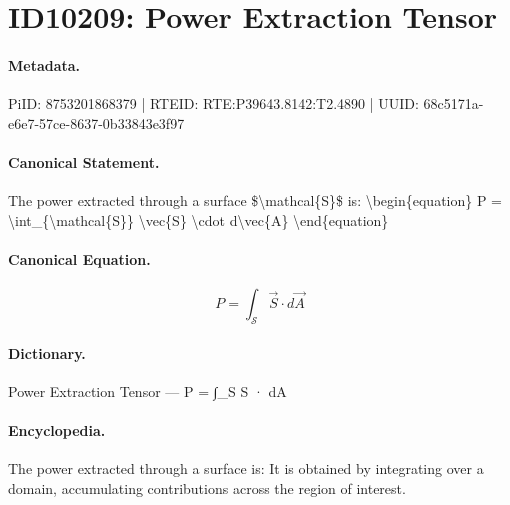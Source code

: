 \section*{ID10209: Power Extraction Tensor}
\paragraph{Metadata.}
PiID: 8753201868379 | RTEID: RTE:P39643.8142:T2.4890 | UUID: 68c5171a-e6e7-57ce-8637-0b33843e3f97

\paragraph{Canonical Statement.}
The power extracted through a surface \$\textbackslash{}mathcal\{S\}\$ is: \textbackslash{}begin\{equation\} P = \textbackslash{}int\_\{\textbackslash{}mathcal\{S\}\} \textbackslash{}vec\{S\} \textbackslash{}cdot d\textbackslash{}vec\{A\} \textbackslash{}end\{equation\}

\paragraph{Canonical Equation.}
\[
P = \int_{\mathcal{S}} \vec{S} \cdot d\vec{A}
\]

\paragraph{Dictionary.}
Power Extraction Tensor — P = ∫\_S S · dA

\paragraph{Encyclopedia.}
The power extracted through a surface is: It is obtained by integrating over a domain, accumulating contributions across the region of interest.
